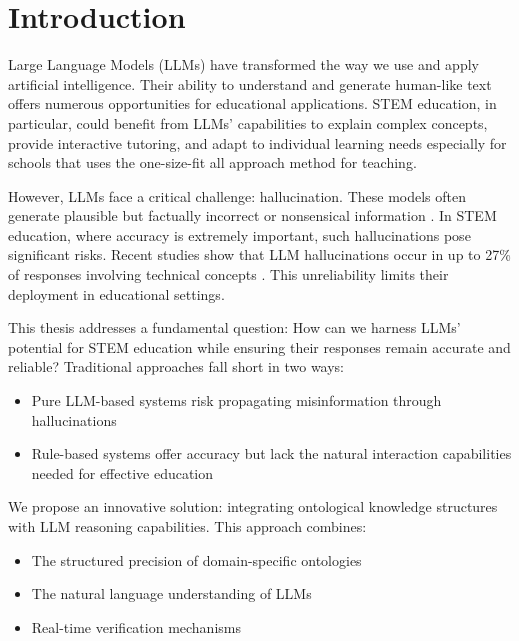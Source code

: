 \chapter{Introduction}
\label{chap:introduction}

Large Language Models (LLMs) have transformed the way we use and apply artificial intelligence. 
Their ability to understand and generate human-like text offers numerous opportunities for educational applications. 
STEM education, in particular, could benefit from LLMs' capabilities to explain complex concepts, provide interactive tutoring, and adapt to individual learning needs especially
for schools that uses the one-size-fit all approach method for teaching.

However, LLMs face a critical challenge: hallucination. These models often generate plausible but factually incorrect or nonsensical information \cite{zhang2024survey}. 
In STEM education, where accuracy is extremely important, such hallucinations pose significant risks. Recent studies show that LLM hallucinations occur in up to 27\% of responses 
involving technical concepts \cite{huang2024survey}. This unreliability limits their deployment in educational settings.

This thesis addresses a fundamental question: How can we harness LLMs' potential for STEM education while ensuring their responses 
remain accurate and reliable? Traditional approaches fall short in two ways:
\begin{itemize}
    \item Pure LLM-based systems risk propagating misinformation through hallucinations \cite{su2024confabulation}
    \item Rule-based systems offer accuracy but lack the natural interaction capabilities needed for effective education
\end{itemize}

We propose an innovative solution: integrating ontological knowledge structures with LLM reasoning capabilities. This approach combines:
\begin{itemize}
    \item The structured precision of domain-specific ontologies \cite{nananukul2023halo}
    \item The natural language understanding of LLMs
    \item Real-time verification mechanisms \cite{hartl2024knowledge}
\end{itemize}

